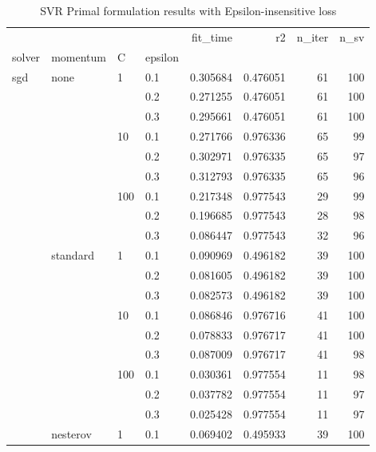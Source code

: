 \begin{table}[H]
\centering
\caption{SVR Primal formulation results with Epsilon-insensitive loss}
\label{primal_svr_eps_cv_results}
\begin{tabular}{llllrrrr}
\toprule
          &   &     &     &  fit\_time &        r2 &  n\_iter &  n\_sv \\
solver & momentum & C & epsilon &           &           &         &       \\
\midrule
sgd & none & 1   & 0.1 &  0.305684 &  0.476051 &      61 &   100 \\
          &   &     & 0.2 &  0.271255 &  0.476051 &      61 &   100 \\
          &   &     & 0.3 &  0.295661 &  0.476051 &      61 &   100 \\
          &   & 10  & 0.1 &  0.271766 &  0.976336 &      65 &    99 \\
          &   &     & 0.2 &  0.302971 &  0.976335 &      65 &    97 \\
          &   &     & 0.3 &  0.312793 &  0.976335 &      65 &    96 \\
          &   & 100 & 0.1 &  0.217348 &  0.977543 &      29 &    99 \\
          &   &     & 0.2 &  0.196685 &  0.977543 &      28 &    98 \\
          &   &     & 0.3 &  0.086447 &  0.977543 &      32 &    96 \\
          & standard & 1   & 0.1 &  0.090969 &  0.496182 &      39 &   100 \\
          &   &     & 0.2 &  0.081605 &  0.496182 &      39 &   100 \\
          &   &     & 0.3 &  0.082573 &  0.496182 &      39 &   100 \\
          &   & 10  & 0.1 &  0.086846 &  0.976716 &      41 &   100 \\
          &   &     & 0.2 &  0.078833 &  0.976717 &      41 &   100 \\
          &   &     & 0.3 &  0.087009 &  0.976717 &      41 &    98 \\
          &   & 100 & 0.1 &  0.030361 &  0.977554 &      11 &    98 \\
          &   &     & 0.2 &  0.037782 &  0.977554 &      11 &    97 \\
          &   &     & 0.3 &  0.025428 &  0.977554 &      11 &    97 \\
          & nesterov & 1   & 0.1 &  0.069402 &  0.495933 &      39 &   100 \\

\end{tabular}
\end{table}
